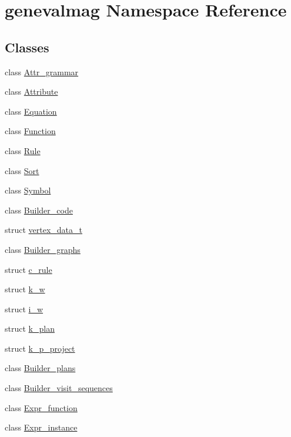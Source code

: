 \hypertarget{namespacegenevalmag}{
\section{genevalmag Namespace Reference}
\label{namespacegenevalmag}
}
\subsection*{Classes}
\begin{CompactItemize}
\item 
class \hyperlink{classgenevalmag_1_1Attr__grammar}{Attr\_\-grammar}
\item 
class \hyperlink{classgenevalmag_1_1Attribute}{Attribute}
\item 
class \hyperlink{classgenevalmag_1_1Equation}{Equation}
\item 
class \hyperlink{classgenevalmag_1_1Function}{Function}
\item 
class \hyperlink{classgenevalmag_1_1Rule}{Rule}
\item 
class \hyperlink{classgenevalmag_1_1Sort}{Sort}
\item 
class \hyperlink{classgenevalmag_1_1Symbol}{Symbol}
\item 
class \hyperlink{classgenevalmag_1_1Builder__code}{Builder\_\-code}
\item 
struct \hyperlink{structgenevalmag_1_1vertex__data__t}{vertex\_\-data\_\-t}
\item 
class \hyperlink{classgenevalmag_1_1Builder__graphs}{Builder\_\-graphs}
\item 
struct \hyperlink{structgenevalmag_1_1c__rule}{c\_\-rule}
\item 
struct \hyperlink{structgenevalmag_1_1k__w}{k\_\-w}
\item 
struct \hyperlink{structgenevalmag_1_1i__w}{i\_\-w}
\item 
struct \hyperlink{structgenevalmag_1_1k__plan}{k\_\-plan}
\item 
struct \hyperlink{structgenevalmag_1_1k__p__project}{k\_\-p\_\-project}
\item 
class \hyperlink{classgenevalmag_1_1Builder__plans}{Builder\_\-plans}
\item 
class \hyperlink{classgenevalmag_1_1Builder__visit__sequences}{Builder\_\-visit\_\-sequences}
\item 
class \hyperlink{classgenevalmag_1_1Expr__function}{Expr\_\-function}
\item 
class \hyperlink{classgenevalmag_1_1Expr__instance}{Expr\_\-instance}

\end{CompactItemize}
